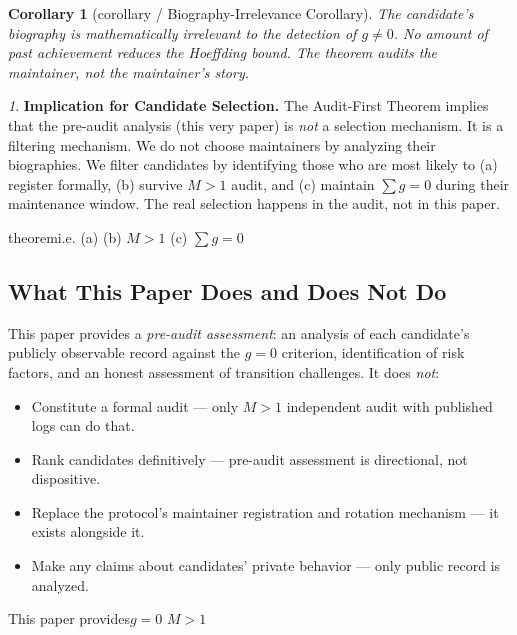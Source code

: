\documentclass[12pt,a4paper]{article}
\newtheorem{corollary}[theorem]{Corollary}
\theoremstyle{remark}
\newtheorem{govinsight}{}[section]
\newenvironment{govbox}{%
  \begin{center}
  \color{insightblue}
  \begin{minipage}{0.92\textwidth}
  \begin{govinsight}
}{%
  \end{govinsight}
  \end{minipage}
  \end{center}
}
\begin{document}
\begin{corollary}[corollary / Biography-Irrelevance Corollary]
\label{cor:biography}
The candidate's biography is mathematically irrelevant to the detection
of $g \neq 0$. No amount of past achievement reduces the Hoeffding bound.
The theorem audits the maintainer, not the maintainer's story.
\end{corollary}

\begin{govbox}
\textbf{Implication for Candidate Selection.}
The Audit-First Theorem implies that the pre-audit analysis (this very paper)
is \textit{not} a selection mechanism. It is a filtering mechanism. We do not
choose maintainers by analyzing their biographies. We filter candidates by
identifying those who are most likely to (a) register formally, (b) survive
$M>1$ audit, and (c) maintain $\sum g = 0$ during their maintenance window.
The real selection happens in the audit, not in this paper.

\textbf{}
theoremi.e.\textit{}
 (a) (b) 
$M>1$ (c) $\sum g = 0$

\end{govbox}

\subsection{What This Paper Does and Does Not Do}

This paper provides a \textit{pre-audit assessment}: an analysis of each
candidate's publicly observable record against the $g=0$ criterion,
identification of risk factors, and an honest assessment of transition
challenges. It does \textit{not}:

\begin{itemize}[leftmargin=*]
    \item Constitute a formal audit — only $M>1$ independent audit with
          published logs can do that.
    \item Rank candidates definitively — pre-audit assessment is directional,
          not dispositive.
    \item Replace the protocol's maintainer registration and rotation
          mechanism — it exists alongside it.
    \item Make any claims about candidates' private behavior — only public
          record is analyzed.
\end{itemize}

\textbf{}This paper provides\textit{}$g=0$
\textit{}$M>1$
\end{document}
